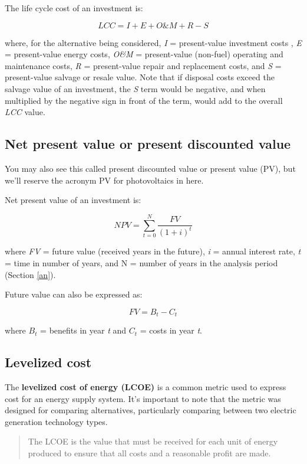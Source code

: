 \documentclass[10pt]{article}
\begin{document}
The life cycle cost of an investment is:

$$LCC = I + E + O\&M + R - S$$

where, for the alternative being considered,  \textit{I} = present-value investment costs , \textit{E} = present-value energy costs, \textit{O\&M} = present-value (non-fuel) operating and maintenance costs, \textit{R} = present-value repair and replacement costs, and \textit{S} = present-value salvage or resale value. Note that if disposal costs exceed the salvage value of an investment, the \textit{S} term would be negative, and when multiplied by the negative sign in front of the term, would add to the overall \textit{LCC} value.



\subsection{Net present value or present discounted value}

You may also see this called present discounted value \cite{Greenlaw_undated-ok} or present value (PV), but we'll reserve the acronym PV for photovoltaics in here.

Net present value of an investment is:

$$NPV = \sum_{t=0}^{N} \frac{FV}{(1+i)^t}$$

where \textit{FV} = future value (received years in the future), \textit{i} = annual interest rate, \textit{t} = time in number of years, and N = number of years in the analysis period (Section \ref{an}). \cite{Greenlaw_undated-ok}

Future value can also be expressed as:

$$FV=B_t-C_t$$

where $B_t$ = benefits in year \textit{t} and $C_t$ = costs in year \textit{t}. \cite{Goswami2007-hf}

\subsection{Levelized cost}

The \textbf{levelized cost of energy (LCOE)} is a common metric used to express cost for an energy supply system. It's important to note that the metric was designed for comparing alternatives, particularly comparing between two electric generation technology types.

\begin{quote}
    The LCOE is the value that must be received for each unit of energy produced to ensure that all costs and a reasonable profit are made. \cite{Goswami2007-hf}
\end{quote}
\end{document}
